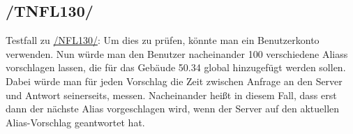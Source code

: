 \subsection*{/TNFL130/}
\label{/TNFL130/} Testfall zu \hyperref[/NFL130/]{/NFL130/}: Um dies zu prüfen, könnte man ein \Gls{Benutzer}konto verwenden. Nun würde man den \Gls{Benutzer} nacheinander 100 verschiedene \Glspl{Alias} vorschlagen lassen, die für das Gebäude 50.34 \gls{global} hinzugefügt werden sollen. Dabei würde man für jeden Vorschlag die Zeit zwischen Anfrage an den \Gls{Server} und Antwort seinerseits, messen. Nacheinander heißt in diesem Fall, dass erst dann der nächste \Gls{Alias} vorgeschlagen wird, wenn der \Gls{Server} auf den aktuellen \Gls{Alias-Vorschlag} geantwortet hat.
